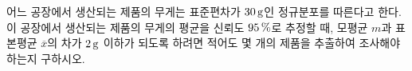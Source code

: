 어느 공장에서 생산되는 제품의 무게는 표준편차가 $30\mkern3mu \mathrm{g}$인 정규분포를 따른다고 한다. 이 공장에서 생산되는 제품의 무게의 평균을 신뢰도 $95\mkern3mu \%$로 추정할 때, 모평균 $m$과 표본평균 $\overline{x}$의 차가 $2\mkern3mu \mathrm{g}$ 이하가 되도록 하려면 적어도 몇 개의 제품을 추출하여 조사해야 하는지 구하시오. 
